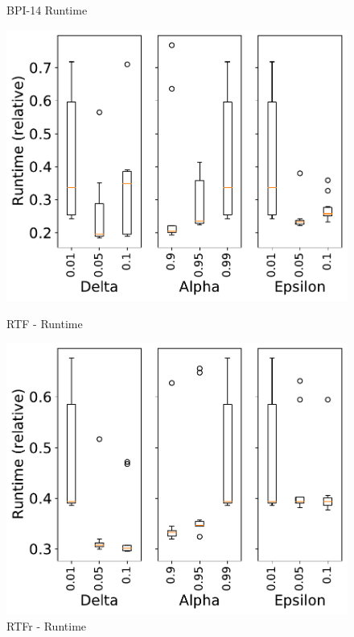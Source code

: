 \documentclass[landscape]{article}
\begin{document}
\begin{figure}[!htb]
\begin{minipage}{0.2\textwidth}
			\caption{BPI-14 Runtime}
		\end{minipage}
		\hfill
		\begin{minipage}{0.2\textwidth}
			\includegraphics[width=1.0\textwidth]{../Road_Traffic_Fines_Management_Process/Road_Traffic_Fines_Management_Process_param_time.pdf}
			\caption{RTF - Runtime}
		\end{minipage}
		\hfill
		\begin{minipage}{0.2\textwidth}
			\includegraphics[width=1.0\textwidth]{../RTFM_model2/RTFM_model2_param_time.pdf}
			\caption{RTFr - Runtime}
		\end{minipage}
	\end{figure}
\end{document}

